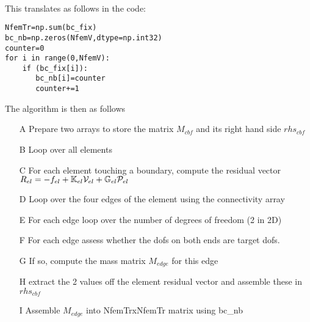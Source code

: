 \begin{center}
\\
\end{center}

This translates as follows in the code:
\begin{lstlisting}
NfemTr=np.sum(bc_fix)
bc_nb=np.zeros(NfemV,dtype=np.int32)
counter=0
for i in range(0,NfemV):
    if (bc_fix[i]):
       bc_nb[i]=counter
       counter+=1
\end{lstlisting}


The algorithm is then as follows

\begin{itemize}
\item[A] Prepare two arrays to store the matrix $M_{cbf}$ and its right hand side $rhs_{cbf}$  

\item[B] 
Loop over all elements 

\item[C] 
For each element touching a boundary, compute the residual vector 
$R_{el}=-f_{el} + {\mathbb{K}}_{el}{\cal V}_{el} + {\mathbb{G}}_{el} {\cal P}_{el}$

\item[D]
Loop over the four edges of the element using the connectivity array

\item[E]
For each edge loop over the number of degrees of freedom (2 in 2D)

\item[F] 
For each edge assess whether the dofs on both ends are target dofs. 

\item[G]
If so, compute the mass matrix $M_{edge}$ for this edge 

\item[H] extract the 2 values off the element residual vector and assemble these
in $rhs_{cbf}$

\item[I] Assemble $M_{edge}$ into NfemTrxNfemTr matrix using bc\_nb
\end{itemize}


